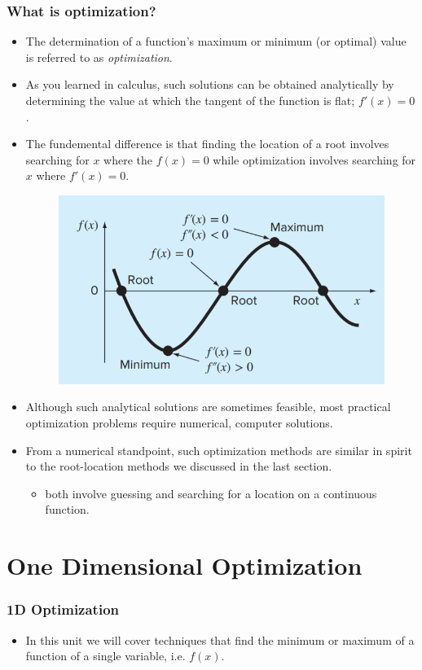 \documentclass{if-beamer}
\begin{document}
\begin{frame}[t]
\frametitle{What is optimization?}
\begin{itemize}
	\item The determination of a function's maximum or minimum (or optimal) value is referred to as \textit{optimization}.
	\item  As you learned in calculus, such solutions can be obtained analytically by determining the value at which the tangent of the function is flat; $f'(x) = 0$.
	\item The fundemental difference is that finding the location of a root  involves searching for $x$ where the $f(x) = 0$ while optimization involves searching for $x$ where $f'(x) = 0$.
	\begin{figure}
		\centering
		\includegraphics[width=.4\textwidth]{figures/optimavsroot}
	\end{figure}
	\item Although such analytical solutions are sometimes feasible, most practical optimization problems require numerical, computer solutions.
	\item From a numerical standpoint, such optimization methods are similar in spirit to the root-location methods we discussed in the last section.
	\begin{itemize}
		\item both involve guessing and searching for a location on a continuous function.
	\end{itemize}

\end{itemize}
\end{frame}

\section{One Dimensional Optimization}
\begin{frame}[t]
	\frametitle{1D Optimization}
	\begin{itemize}
		\item In this unit we will cover techniques that find the minimum or maximum of a function of a single variable, i.e. $f(x)$.
	\end{itemize}
\end{frame}
\end{document}

